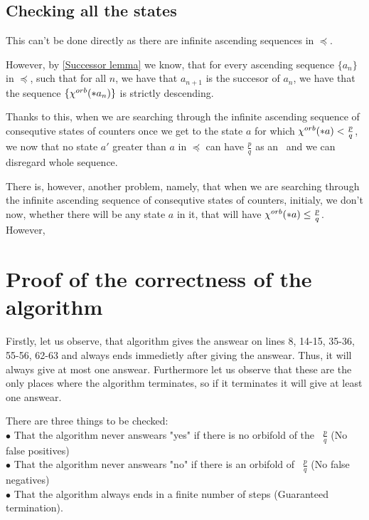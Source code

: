 
\subsection{Checking all the states}
This can't be done directly as there are infinite ascending sequences in $\preceq$. 

However, by \ref{Successor lemma} we know, that for every ascending sequence $\{a_n\}$ 
in $\preceq$, such 
that for all $n$, we have that $a_{n+1}$ is the succesor of $a_n$, we have that the sequence 
$\{{\chi^{orb}(*a_n)}\}$ is strictly descending. 

Thanks to this, 
when we are searching through the infinite ascending sequence of consequtive 
states of counters once we get to the state $a$ for which ${\chi^{orb}(*a)} < \frac{p}{q}$, we now 
that no state $a'$ greater than $a$ in $\preceq$ can have $\frac{p}{q}$ as an 
\Eoc\ and we can disregard whole sequence. 

There is, however, another problem, namely, that when we are searching through 
the infinite ascending sequence of consequtive 
states of counters, initialy, we don't now, whether there will be any state $a$ in it, that 
will have ${\chi^{orb}(*a)} \leq \frac{p}{q}$. However, 
\section{Proof of the correctness of the algorithm}
Firstly, let us observe, that algorithm gives the answear on lines 8, 14-15, 35-36, 55-56, 
62-63 and 
always ends immedietly after giving the answear. Thus, it will always give at most one answear.
Furthermore let us observe that these are the only places where the algorithm terminates, 
so if it terminates it will give at least one answear.
 
There are three things to be checked: \\
$\bullet$ That the algorithm never answears "yes" if there is no orbifold of the \Eoc\ 
$\frac{p}{q}$ (No false positives)\\
$\bullet$ That the algorithm never answears "no" if there is an orbifold of \Eoc\ 
$\frac{p}{q}$ (No false negatives)\\ 
$\bullet$ That the algorithm always ends in a finite number of steps (Guaranteed termination). 




